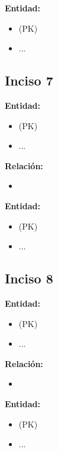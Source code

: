 \documentclass[a4paper,12pt]{article}
\begin{document}
            \textbf{Entidad: }
                \begin{itemize}
                    \item \underline{\texttt{}} (PK)
                    \item ...
                \end{itemize}

        \subsection*{Inciso 7}
            \textbf{Entidad: }
                \begin{itemize}
                    \item \underline{\texttt{}} (PK)
                    \item ...
                \end{itemize}

            \textbf{Relación: }
                \begin{itemize}
                    \item 
                \end{itemize}

            \textbf{Entidad: }
                \begin{itemize}
                    \item \underline{\texttt{}} (PK)
                    \item ...
                \end{itemize}

        \subsection*{Inciso 8}
            \textbf{Entidad: }
                \begin{itemize}
                    \item \underline{\texttt{}} (PK)
                    \item ...
                \end{itemize}

            \textbf{Relación: }
                \begin{itemize}
                    \item 
                \end{itemize}

            \textbf{Entidad: }
                \begin{itemize}
                    \item \underline{\texttt{}} (PK)
                    \item ...
                \end{itemize}
\end{document}
